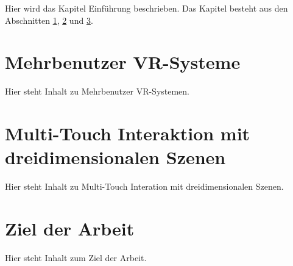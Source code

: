 Hier wird das Kapitel Einführung beschrieben. Das Kapitel besteht aus den Abschnitten \ref{sec:mehrbenutzer_vr_systeme}, \ref{sec:multi_touch_interaktion_mit_3d_szenen} und \ref{sec:ziel_der_arbeit}.

\section{Mehrbenutzer VR-Systeme}
\label{sec:mehrbenutzer_vr_systeme}

Hier steht Inhalt zu Mehrbenutzer VR-Systemen.


\section{Multi-Touch Interaktion mit dreidimensionalen Szenen}
\label{sec:multi_touch_interaktion_mit_3d_szenen}

Hier steht Inhalt zu Multi-Touch Interation mit dreidimensionalen Szenen.


\section{Ziel der Arbeit}
\label{sec:ziel_der_arbeit}

Hier steht Inhalt zum Ziel der Arbeit.